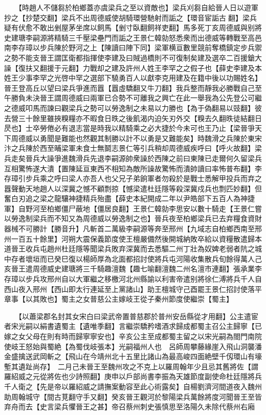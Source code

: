 　　【時趙人不儲芻於柏鄉蓋亦虞梁兵之至以資敵也】梁兵刈芻自給晉人日以遊軍抄之【抄楚交翻】梁兵不出周德威使胡騎環營馳射而詬之【環音宦詬古翻】梁兵疑有伏愈不敢出剉屋茅坐席以飼馬【剉寸臥翻飼祥吏翻】馬多死丁亥周德威與别將史建瑭李嗣源將精騎三千壓梁壘門而詬之王景仁韓勍怒悉衆而出德威等轉戰至高邑南李存璋以步兵陳於野河之上【陳讀曰陣下同】梁軍横亘數里競前奪橋鎮定步兵禦之勢不能支晉王謂匡衛都指揮使李建及曰賊過橋則不可復制矣建及選卒二百援鎗大譟【復扶又翻援于元翻】力戰却之建及許州人姓王李罕之之假子也【薛史李建及本姓王少事李罕之光啓中罕之選部下驍勇百人以獻李克用建及在籍中後以功賜姓名】晉王登高丘以望曰梁兵爭進而囂【囂虛驕翻又牛刀翻】我兵整而靜我必勝戰自己至午勝負未決晉王謂周德威曰兩軍已合勢不可離我之興亡在此一舉我為公先登公可繼之德威叩馬而諫曰觀梁兵之勢可以勞逸制之未易以力勝也【為于偽翻易以豉翻】彼去營三十餘里雖挾糗糧亦不暇食日昳之後飢渴内迫矢刃外交【糗去久翻昳徒結翻日昃也】士卒勞倦必有退志當是時我以精騎乘之必大捷於今未可也王乃止【梁晉爭天下周德威以勇聞是難能也然觀其制勝以計不以勇是又難能矣】時魏滑之兵陳於東宋汴之兵陳於西至晡梁軍未食士無鬬志景仁等引兵稍却周德威疾呼曰【呼火故翻】梁兵走矣晉兵大譟爭進魏滑兵先退李嗣源帥衆譟於西陳之前曰東陳已走爾何久留梁兵互相驚怖遂大潰【置陳延亘東西不相知為敵所譟故驚怖而潰帥讀曰率怖普布翻】李存璋引步兵乘之呼曰梁人亦吾人也父兄子弟餉軍者勿殺於是戰士悉解甲投兵而弃之囂聲動天地趙人以深冀之憾不顧剽掠【憾梁遣杜廷隱等殺深冀戍兵也剽匹妙翻】但奮白刃追之梁之龍驤神捷精兵殆盡【薛史本紀開成二年以尹皓部下五百人為神捷軍】自野河至柏鄉僵尸蔽地【僵居良翻】王景仁韓勍李思安以數十騎走【王景仁嘗以勞逸制梁兵而不知又為周德威以勞逸制之也】晉兵夜至柏鄉梁兵已去弃糧食資財器械不可勝計【勝音升】凡斬首二萬級李嗣源等奔至邢州【九域志自柏鄉西南至邢州一百五十餘里】河朔大震保義節度使王檀嚴備然後開城納敗卒給以資糧散遣歸本道晉王收兵屯趙州杜廷隱等聞梁兵敗弃深冀而去悉驅二州丁壯為奴婢老弱者阬之城中存者壞垣而已癸巳復以楊師厚為北面都招討使將兵屯河陽收集散兵旬餘得萬人己亥晉王遣周德威史建瑭將三千騎趣澶魏【趣七喻翻澶魏二州名澶市連翻】張承業李存璋以步兵攻邢州自以大軍繼之移檄河北州縣諭以利害帝遣别將徐仁溥將兵千人自西山夜入邢州【西山即太行連延至上黨諸山】助王檀城守己酉罷王景仁招討使落平章事【以其敗也】蜀主之女普慈公主嫁岐王從子秦州節度使繼崇【蜀主】

　　【以蕭梁郡名封其女宋白曰梁武帝置普慈郡於普州安岳縣從才用翻】公主遣宦者宋光嗣以絹書遺蜀主【遺唯季翻】言繼崇驕矜嗜酒求歸成都蜀主召公主歸寧【已嫁之女父母在則有時而歸寧寧安也】辛亥公主至成都蜀主留之以宋光嗣為閤門南院使岐王怒始與蜀絶【為蜀伐岐張本】光嗣福州人也　呂師周攀藤緣崖入飛山洞襲潘金盛擒送武岡斬之【飛山在今靖州北十五里比諸山為最高峻四面絶壁千仭環山有壕塹其遺趾尚存】　二月己未晉王至魏州攻之不克上以羅周翰年少且忌其舊將佐【謂羅紹威之元從將佐也少詩照翻】庚申以戶部尚書李振為天雄節度副使命杜廷隱將兵千人衛之【先是帝以羅紹威之請撫案動容至此心術露矣】自楊劉濟河間道夜入魏州助周翰城守【間古莧翻守手又翻】癸亥晉王觀河於黎陽梁兵萬餘將度河聞晉王至皆弃舟而去【史言梁兵懼晉王之甚】帝召蔡州刺史張慎思至洛陽久未除代蔡州右廂

